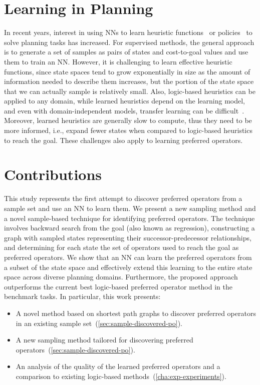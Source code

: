 \documentclass[ppgc,diss,english]{iiufrgs}
\begin{document}
\section{Learning in Planning}
\label{sec:intro-learning-planning}
In recent years, interest in using NNs to learn heuristic functions~\cite{Ferber.etal/2020a,Yu.etal/2020,Shen.etal/2020,Ferber.etal/2022,OToole/2022,Bettker.etal/2022} or policies~\cite{Toyer.etal/2018,Toyer.etal/2020,Stahlberg.etal/2022} to solve planning tasks has increased. For supervised methods, the general approach is to generate a set of samples as pairs of states and cost-to-goal values and use them to train an NN. However, it is challenging to learn effective heuristic functions, since state spaces tend to grow exponentially in size as the amount of information needed to describe them increases, but the portion of the state space that we can actually sample is relatively small. Also, logic-based heuristics can be applied to any domain, while learned heuristics depend on the learning model, and even with domain-independent models, transfer learning can be difficult~\cite{Shen.etal/2020}. Moreover, learned heuristics are generally slow to compute, thus they need to be more informed, i.e., expand fewer states when compared to logic-based heuristics to reach the goal. These challenges also apply to learning preferred operators.

\section{Contributions}
\label{sec:intro-contributions}
This study represents the first attempt to discover preferred operators from a sample set and use an NN to learn them. We present a new sampling method and a novel sample-based technique for identifying preferred operators. The technique involves backward search from the goal (also known as regression), constructing a graph with sampled states representing their successor-predecessor relationships, and determining for each state the set of operators used to reach the goal as preferred operators. We show that an NN can learn the preferred operators from a subset of the state space and effectively extend this learning to the entire state space across diverse planning domains. Furthermore, the proposed approach outperforms the current best logic-based preferred operator method in the benchmark tasks. In particular, this work presents:

\begin{itemize}
\item A novel method based on shortest path graphs to discover preferred operators in an existing sample set~(\cref{sec:sample-discovered-po}).
\item A new sampling method tailored for discovering preferred operators~(\cref{sec:sample-discovered-po}).
\item An analysis of the quality of the learned preferred operators and a comparison to existing logic-based methods~(\cref{cha:exp-experiments}).
\end{itemize}
%
%
\end{document}
